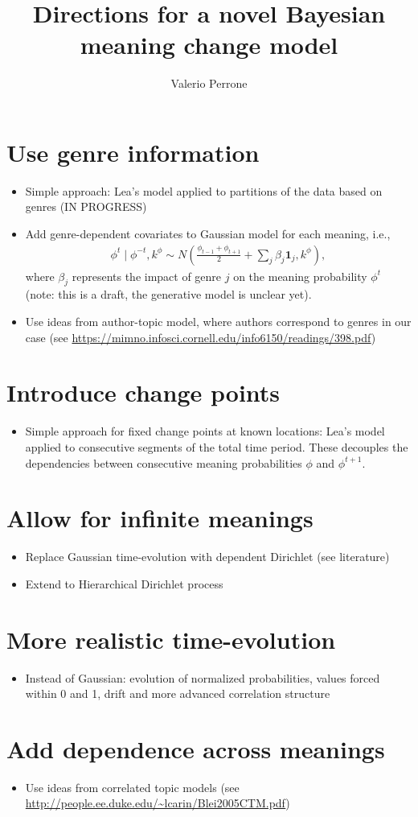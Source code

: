 \documentclass{article}
\title{Directions for a novel Bayesian meaning change model}
\author{Valerio Perrone}
\begin{document}
\maketitle 

\section{Use genre information}
\begin{itemize}
\item Simple approach: Lea's model applied to partitions of the data based on genres (IN PROGRESS)
\item Add genre-dependent covariates to Gaussian model for each meaning, i.e., 
\begin{align*}
\phi^t \mid \phi^{-t}, k^{\phi} \sim  N \left( \frac{\phi_{t-1} +  \phi_{t+1}}{2} + \sum_{j}  \beta_{j} \textbf{1}_j , k^{\phi} \right ),
\end{align*}
where $\beta_{j}$ represents the impact of genre $j$ on the meaning probability $\phi^t$ (note: this is a draft, the generative model is unclear yet). 
\item Use ideas from author-topic model, where authors correspond to genres in our case (see \url{https://mimno.infosci.cornell.edu/info6150/readings/398.pdf})
\end{itemize}


\section{Introduce change points}
\begin{itemize}
\item Simple approach for fixed change points at known locations: Lea's model applied to consecutive segments of the total time period. These decouples the dependencies between consecutive meaning probabilities $\phi$ and $\phi^{t+1}$.
\end{itemize}
\section{Allow for infinite meanings}
\begin{itemize}
\item Replace Gaussian time-evolution with dependent Dirichlet (see literature)
\item Extend to Hierarchical Dirichlet process
\end{itemize}
\section{More realistic time-evolution}
\begin{itemize}
\item Instead of Gaussian: evolution of normalized probabilities, values forced within 0 and 1, drift and more advanced correlation structure
\end{itemize}
\section{Add dependence across meanings}
\begin{itemize}
\item Use ideas from correlated topic models (see \url{http://people.ee.duke.edu/~lcarin/Blei2005CTM.pdf})
\end{itemize}
\end{document}
